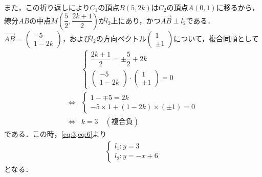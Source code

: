 \documentclass[../../main.tex]{subfiles}
\begin{document}
また，この折り返しにより$C_1$の頂点$B(5, 2k)$は$C_2$の頂点$A(0, 1)$に移るから，線分$AB$の中点$M\left(\dfrac{5}{2}, \dfrac{2k+1}{2}\right)$が$l_2$上にあり，かつ$\overrightarrow{AB} \perp l_2$である．
$\overrightarrow{AB} =
\begin{pmatrix} -5 \\ 1-2k
\end{pmatrix}$，および$l_2$の方向ベクトル$
\begin{pmatrix} 1 \\ \pm 1
\end{pmatrix}$について，複合同順として
\begin{align}
  &
  \begin{cases}
    \dfrac{2k+1}{2} = \pm \dfrac{5}{2} + 2k \\
    \begin{pmatrix} -5 \\ 1-2k
    \end{pmatrix} \cdot
    \begin{pmatrix} 1 \\ \pm 1
    \end{pmatrix} = 0
  \end{cases} \\
  \iff
  &
  \begin{cases}
    1 - \mp 5 = 2k \\
    -5 \times 1 + (1-2k) \times (\pm 1) = 0
  \end{cases} \\
  \iff
  & k = 3 \quad (\text{複合負})
\end{align}
である．この時，\cref{eq:3,eq:6}より
\begin{align}
  \begin{cases}
    l_1: y=3 \\
    l_2: y=-x+6
  \end{cases}
\end{align}
となる．
\end{document}
